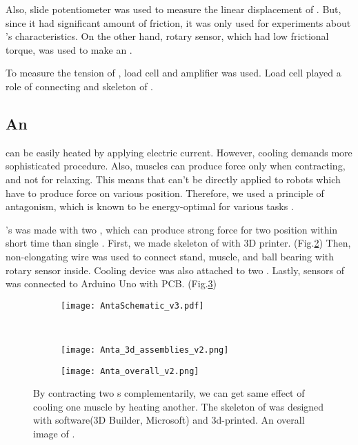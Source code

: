Also, slide potentiometer was used to measure the linear displacement of \scpnospace. But, since it had significant amount of friction, it was only used for experiments about \scpnospace's characteristics. On the other hand, rotary sensor, which had low frictional torque, was used to make an \antanospace. 

To measure the tension of \scpnospace, load cell and amplifier was used.
Load cell played a role of connecting \scp and skeleton of \antanospace.

\subsection{An \ANTA}
\scp can be easily heated by applying electric current. However, cooling demands more sophisticated procedure. Also, muscles can produce force only when contracting, and not for relaxing. This means that \scp can't be directly applied to robots which have to produce force on various position.
Therefore, we used a principle of antagonism, which is known to be energy-optimal for various tasks \cite{antagonism}.

\Antanospace's was made with two \scpnospace, which can produce strong force for two position within short time than single \scpnospace.
First, we made skeleton of \anta with 3D printer. (Fig.\ref{3d_assemblies}) Then, non-elongating wire was used to connect stand, muscle, and ball bearing with rotary sensor inside. Cooling device was also attached to two \scpnospace. Lastly, sensors of \anta was connected to Arduino Uno with PCB. (Fig.\ref{anta_overall})

\begin{figure}[t]
	\centering
	\begin{subfigure}[t]{0.5\textwidth}
		\centering\texttt{[image: AntaSchematic\_v3.pdf]}
		\caption{\label{anta_sch}}
	\end{subfigure}
	~			
	\begin{subfigure}[t]{0.3\textwidth}
		\centering\texttt{[image: Anta\_3d\_assemblies\_v2.png]}
		\caption{\label{3d_assemblies}}
	\end{subfigure}
	
	\begin{subfigure}[t]{0.81\textwidth}
		\centering\texttt{[image: Anta\_overall\_v2.png]}
		\caption{\label{anta_overall}}
	\end{subfigure}
	
	\caption[An \anta]{ By contracting two \scpnospace s complementarily, we can get same effect of cooling one muscle by heating another.  The skeleton of \anta was designed with software(3D Builder, Microsoft) and 3d-printed.  An overall image of \antanospace.}
	\label{anta_design}
\end{figure}
